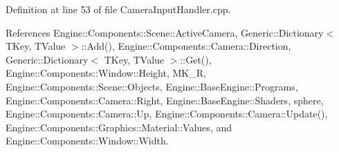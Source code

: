 Definition at line 53 of file Camera\+Input\+Handler.\+cpp.



References Engine\+::\+Components\+::\+Scene\+::\+Active\+Camera, Generic\+::\+Dictionary$<$ T\+Key, T\+Value $>$\+::\+Add(), Engine\+::\+Components\+::\+Camera\+::\+Direction, Generic\+::\+Dictionary$<$ T\+Key, T\+Value $>$\+::\+Get(), Engine\+::\+Components\+::\+Window\+::\+Height, M\+K\+\_\+R, Engine\+::\+Components\+::\+Scene\+::\+Objects, Engine\+::\+Base\+Engine\+::\+Programs, Engine\+::\+Components\+::\+Camera\+::\+Right, Engine\+::\+Base\+Engine\+::\+Shaders, sphere, Engine\+::\+Components\+::\+Camera\+::\+Up, Engine\+::\+Components\+::\+Camera\+::\+Update(), Engine\+::\+Components\+::\+Graphics\+::\+Material\+::\+Values, and Engine\+::\+Components\+::\+Window\+::\+Width.


